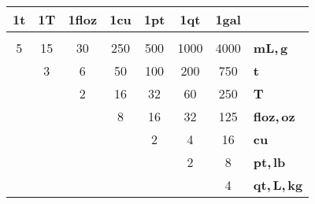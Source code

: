 \documentclass{standalone}
\newcommand\g{\color{gray}}
\newcommand\1{{\footnotesize1\hspace{0.2ex}}\bfseries}
\begin{document}
\sf
\begin{tabular}{@{} c @{\,\,\,} c @{\,} c *4{@{\,\,}c@{\,\,}} @{\,} >{\bfseries}l @{}}
\1{t} & \1{$\!$T} & \1{floz} & \1{cu} & \1{pt} & \1{qt} & \1{gal} \\[0.5mm] \hline {} \\[-3mm]
\,5\, & 15 & 30 & 250 & 500 & 1000 & 4000 & mL\g,\,g \\
& 3 & 6 & 50 & 100 & 200 & 750 & t \\
&& 2 & 16 & 32 & 60 & 250 & T \\
&&& 8 & 16 & 32 & 125 & floz\g,\,oz \\
&&&& 2 & 4 & 16 & cu \\
&&&&& 2 & 8 & pt\g,\,lb \\
&&&&&& 4 & qt\g,\,L,\,kg
\end{tabular}
\end{document}
